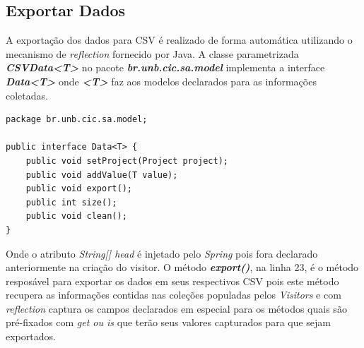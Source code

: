 \subsection{Exportar Dados}
A exportação dos dados para \acs{CSV} é realizado de forma automática utilizando o mecanismo de \textit{reflection} fornecido por Java. A classe parametrizada \textbf{\textit{CSVData<T>}} no pacote \textbf{\textit{br.unb.cic.sa.model}} implementa a interface \textit{\textbf{Data<T>}} onde \textbf{\textit{<T>}} faz  aos modelos declarados para as informações coletadas.

\begin{lstlisting}
package br.unb.cic.sa.model;

public interface Data<T> {
	public void setProject(Project project);
	public void addValue(T value);
	public void export();
	public int size();
	public void clean();
}
\end{lstlisting}


Onde o atributo \textit{String[] head} é injetado pelo \textit{Spring} pois fora declarado anteriormente na criação do visitor. O método \textbf\textit{{export()}}, na linha 23, é o método resposável para exportar os dados em seus respectivos \acs{CSV} pois este método recupera as informações contidas nas coleções populadas pelos \textit{Visitors} e com \textit{reflection} captura os campos declarados em especial para os métodos quais são pré-fixados com \textit{get ou is} que terão seus valores capturados para que sejam exportados.

